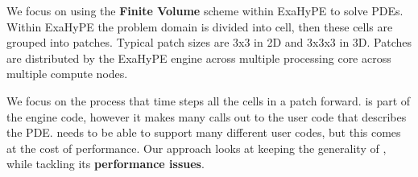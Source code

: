 We focus on using the \textbf{Finite Volume} scheme within ExaHyPE to solve PDEs.
Within ExaHyPE the problem domain is divided into cell, then these cells are grouped into patches.
Typical patch sizes are 3x3 in 2D and 3x3x3 in 3D.
Patches are distributed by the ExaHyPE engine across multiple processing core across multiple compute nodes.

We focus on the  process that time steps all the cells in a patch forward.
 is part of the engine code, however it makes many calls out to the user code that describes the PDE.
 needs to be able to support many different user codes, but this comes at the cost of performance.
Our approach looks at keeping the generality of , while tackling its \textbf{performance issues}.  